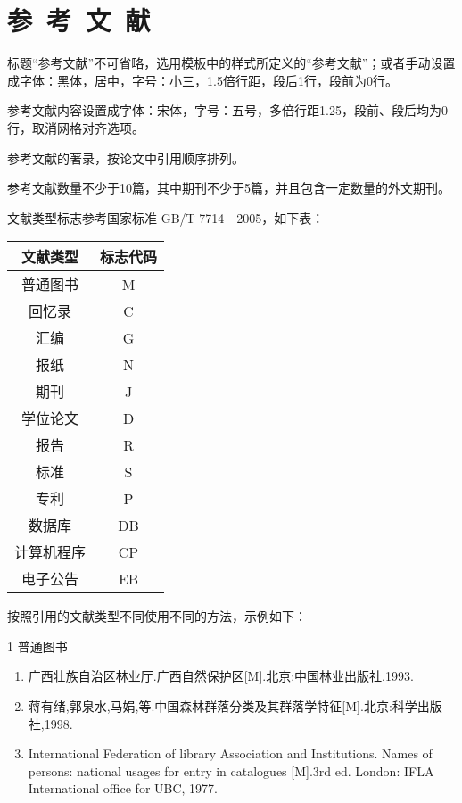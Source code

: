 \song\wuhao
\setmainfont{宋体}
\linespread{1.25}
\chapter*{\hfill 参~考~文~献 \hfill}
\label{reference}
标题“参考文献”不可省略，选用模板中的样式所定义的“参考文献”；或者手动设置成字体：黑体，居中，字号：小三，1.5倍行距，段后1行，段前为0行。

参考文献内容设置成字体：宋体，字号：五号，多倍行距1.25，段前、段后均为0行，取消网格对齐选项。

参考文献的著录，按论文中引用顺序排列。

参考文献数量不少于10篇，其中期刊不少于5篇，并且包含一定数量的外文期刊。

文献类型标志参考国家标准 GB/T 7714－2005，如下表：

\begin{table}[h]
	\centering
	\begin{tabular}{cc}
	\hline
	文献类型&标志代码\\
	\hline
	普通图书&M\\
	回忆录&C\\
	汇编&G\\
	报纸&N\\
	期刊&J\\
	学位论文&D\\
	报告&R\\
	标准&S\\
	专利&P\\
	数据库&DB\\
	计算机程序&CP\\
	电子公告&EB\\
	\hline
	\end{tabular}
\end{table}

按照引用的文献类型不同使用不同的方法，示例如下：

1 普通图书
\begin{enumerate}
\item 广西壮族自治区林业厅.广西自然保护区[M].北京:中国林业出版社,1993.
\item 蒋有绪,郭泉水,马娟,等.中国森林群落分类及其群落学特征[M].北京:科学出版社,1998.
\item International Federation of library Association and Institutions. Names of persons: national usages for entry in catalogues [M].3rd ed. London: IFLA International office for UBC, 1977.
\end{enumerate}
\vspace{17.06pt}

